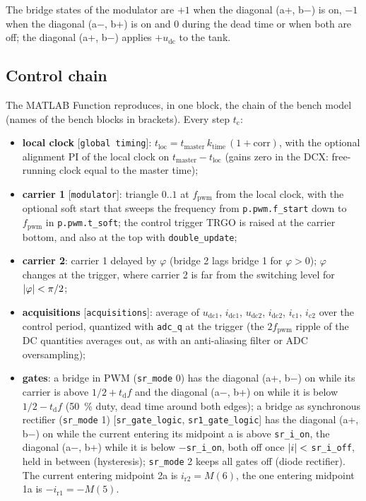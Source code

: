 \documentclass[12pt,a4paper]{scrartcl}
\newcommand{\ped}[1]{_{\mathrm{#1}}}
\newcommand{\code}[1]{\texttt{#1}}
\begin{document}
\begin{onehalfspace}
\noindent The bridge states of the modulator are $+1$ when the diagonal (a+, b$-$) is on, $-1$ when the diagonal (a$-$, b+) is on and $0$ during the dead time or when both are off; the diagonal (a+, b$-$) applies $+u\ped{dc}$ to the tank.

\subsection{Control chain}
\label{sec:ctrl_chain}

The MATLAB Function reproduces, in one block, the chain of the bench model (names of the bench blocks in brackets). Every step $t\ped{c}$:

\begin{itemize}[nosep]
	\item \textbf{local clock} [\code{global timing}]: $t\ped{loc} = t\ped{master}\, k\ped{time}\,(1 + \mathrm{corr})$, with the optional alignment PI of the local clock on $t\ped{master} - t\ped{loc}$ (gains zero in the DCX: free-running clock equal to the master time);
	\item \textbf{carrier 1} [\code{modulator}]: triangle $0..1$ at $f\ped{pwm}$ from the local clock, with the optional soft start that sweeps the frequency from \code{p.pwm.f\_start} down to $f\ped{pwm}$ in \code{p.pwm.t\_soft}; the control trigger TRGO is raised at the carrier bottom, and also at the top with \code{double\_update};
	\item \textbf{carrier 2}: carrier 1 delayed by $\varphi$ (bridge 2 lags bridge 1 for $\varphi > 0$); $\varphi$ changes at the trigger, where carrier 2 is far from the switching level for $\abs{\varphi} < \pi/2$;
	\item \textbf{acquisitions} [\code{acquisitions}]: average of $u\ped{dc1}$, $i\ped{dc1}$, $u\ped{dc2}$, $i\ped{dc2}$, $i\ped{c1}$, $i\ped{c2}$ over the control period, quantized with \code{adc\_q} at the trigger (the $2 f\ped{pwm}$ ripple of the DC quantities averages out, as with an anti-aliasing filter or ADC oversampling);
	\item \textbf{gates}: a bridge in PWM (\code{sr\_mode} 0) has the diagonal (a+, b$-$) on while its carrier is above $1/2 + t\ped{d} f$ and the diagonal (a$-$, b+) on while it is below $1/2 - t\ped{d} f$ (\SI{50}{\percent} duty, dead time around both edges); a bridge as synchronous rectifier (\code{sr\_mode} 1) [\code{sr\_gate\_logic}, \code{sr1\_gate\_logic}] has the diagonal (a+, b$-$) on while the current entering its midpoint a is above \code{sr\_i\_on}, the diagonal (a$-$, b+) while it is below $-$\code{sr\_i\_on}, both off once $\abs{i} <$ \code{sr\_i\_off}, held in between (hysteresis); \code{sr\_mode} 2 keeps all gates off (diode rectifier). The current entering midpoint 2a is $i\ped{r2} = M(6)$, the one entering midpoint 1a is $-i\ped{r1} = -M(5)$.
\end{itemize}


\end{onehalfspace}
\end{document}
